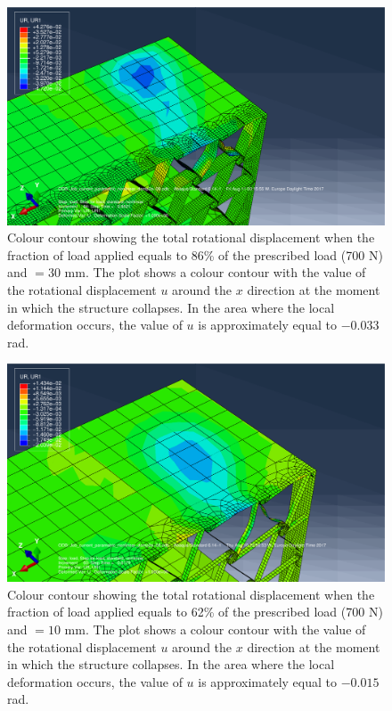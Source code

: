       \begin{figure}[!htpb] %
        \centering
        \includegraphics[width=0.8 \textwidth]{figures/result-sim/B/30_UR1}
        \caption[Colour contour showing the total rotational displacement when the fraction of load applied equals to 86\% of the prescribed load (700 N) and \chiB$= 30$ mm]{Colour contour showing the total rotational displacement when the fraction of load applied equals to 86\% of the prescribed load (700 N) and \chiB$= 30$ mm. The plot shows a colour contour with the value of the rotational displacement $u$ around the $x$ direction at the moment in which the structure collapses. In the area where the local deformation occurs, the value of $u$ is approximately equal to $-0.033$ rad.}
        \label{fig:30_UR1}
      \end{figure}

      \begin{figure}[!htpb] %
        \centering
        \includegraphics[width=0.8 \textwidth]{figures/result-sim/B/10_UR1}
        \caption[Colour contour showing the total rotational displacement when the fraction of load applied equals to 62\% of the prescribed load (700 N) and \chiB$= 10$ mm]{Colour contour showing the total rotational displacement when the fraction of load applied equals to 62\% of the prescribed load (700 N) and \chiB$= 10$ mm. The plot shows a colour contour with the value of the rotational displacement $u$ around the $x$ direction at the moment in which the structure collapses. In the area where the local deformation occurs, the value of $u$ is approximately equal to $-0.015$ rad.}
        \label{fig:10_UR1}
      \end{figure}

